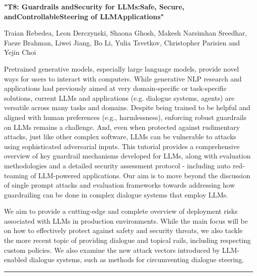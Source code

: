 \begin{center}
    \Large{\textbf{"T8: Guardrails andSecurity for LLMs:Safe, Secure, andControllableSteering of LLMApplications"}\\}
    \par\bigskip
    \large{Traian Rebedea, Leon Derczynski, Shaona Ghosh, Makesh Narsimhan Sreedhar,
Faeze Brahman, Liwei Jiang, Bo Li, Yulia Tsvetkov, Christopher Parisien and Yejin Choi}\\
    \par\bigskip

\end{center}

Pretrained generative models, especially large language models, provide novel ways for users to interact with computers. While generative NLP research and applications had previously aimed at very domain-specific or task-specific solutions, current LLMs and applications (e.g. dialogue systems, agents) are versatile across many tasks and domains. Despite being trained to be helpful and aligned with human preferences (e.g., harmlessness), enforcing robust guardrails on LLMs remains a challenge. And, even when protected against rudimentary attacks, just like other complex software, LLMs can be vulnerable to attacks using sophisticated adversarial inputs. This tutorial provides a comprehensive overview of key guardrail mechanisms developed for LLMs, along with evaluation methodologies and a detailed security assessment protocol - including auto red-teaming of LLM-powered applications. Our aim is to move beyond the discussion of single prompt attacks and evaluation frameworks towards addressing how guardrailing can be done in complex dialogue systems that employ LLMs.

We aim to provide a cutting-edge and complete overview of deployment risks associated with LLMs in production environments. While the main focus will be on how to effectively protect against safety and security threats, we also tackle the more recent topic of providing dialogue and topical rails, including respecting custom policies. We also examine the new attack vectors introduced by LLM-enabled dialogue systems, such as methods for circumventing dialogue steering.
\begin{center}
    \noindent\rule{200px}{1pt}
\end{center}
